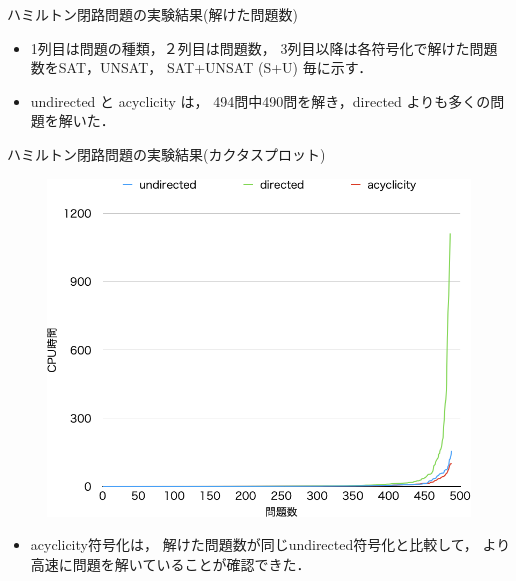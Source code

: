 \documentclass[dvipdfmx,10pt]{beamer}
\begin{document}
\begin{frame}{ハミルトン閉路問題の実験結果(解けた問題数)}

\begin{itemize}
\item 1列目は問題の種類，２列目は問題数，
  3列目以降は各符号化で解けた問題数を\textsf{SAT}，\textsf{UNSAT}，
  \textsf{SAT+UNSAT} (\textsf{S+U}) 毎に示す．
\item \textsf{undirected} と \textsf{acyclicity} は，
  494問中490問を解き，\textsf{directed} よりも多くの問題を解いた．
\end{itemize}
\end{frame}

\begin{frame}{ハミルトン閉路問題の実験結果(カクタスプロット)}
\begin{figure}[tb]
\begin{center}
  \includegraphics[width=0.7\linewidth]{fig/cactus.png}
\label{cactus}
\end{center}
\end{figure}

\begin{itemize}
\item \textsf{acyclicity}符号化は，
  解けた問題数が同じ\textsf{undirected}符号化と比較して，
  より高速に問題を解いていることが確認できた．
\end{itemize}
\end{frame}
\end{document}
